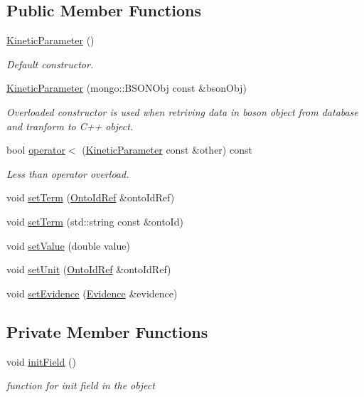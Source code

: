 \subsection*{Public Member Functions}
\begin{DoxyCompactItemize}
\item 
\hyperlink{classunisys_1_1KineticParameter_a107ffde8042bf3438e7f10fe5a4a7332}{Kinetic\-Parameter} ()
\begin{DoxyCompactList}\small\item\em Default constructor. \end{DoxyCompactList}\item 
\hyperlink{classunisys_1_1KineticParameter_a4642bb482bdcb05cdd80bfd70046b244}{Kinetic\-Parameter} (mongo\-::\-B\-S\-O\-N\-Obj const \&bson\-Obj)
\begin{DoxyCompactList}\small\item\em Overloaded constructor is used when retriving data in boson object from database and tranform to C++ object. \end{DoxyCompactList}\item 
bool \hyperlink{classunisys_1_1KineticParameter_a784e2bd0fe8f2e1d8b72f8f4c1af7add}{operator$<$} (\hyperlink{classunisys_1_1KineticParameter}{Kinetic\-Parameter} const \&other) const 
\begin{DoxyCompactList}\small\item\em Less than operator overload. \end{DoxyCompactList}\item 
void \hyperlink{classunisys_1_1KineticParameter_afa67168536156bf838bf8b31abb70966}{set\-Term} (\hyperlink{classunisys_1_1OntoIdRef}{Onto\-Id\-Ref} \&onto\-Id\-Ref)
\item 
void \hyperlink{classunisys_1_1KineticParameter_a7bd5c02a95e97b67b44ae069be83a80d}{set\-Term} (std\-::string const \&onto\-Id)
\item 
void \hyperlink{classunisys_1_1KineticParameter_a551e087e8aca7dd05edde40bcc50265f}{set\-Value} (double value)
\item 
void \hyperlink{classunisys_1_1KineticParameter_a3100673430d3174515d8a0e8864e60a3}{set\-Unit} (\hyperlink{classunisys_1_1OntoIdRef}{Onto\-Id\-Ref} \&onto\-Id\-Ref)
\item 
void \hyperlink{classunisys_1_1KineticParameter_addfc6fe1f5bec492188231525a69ffc6}{set\-Evidence} (\hyperlink{classunisys_1_1Evidence}{Evidence} \&evidence)
\end{DoxyCompactItemize}
\subsection*{Private Member Functions}
\begin{DoxyCompactItemize}
\item 
void \hyperlink{classunisys_1_1KineticParameter_a433dff8934423dc18efda6bb44b2f477}{init\-Field} ()
\begin{DoxyCompactList}\small\item\em function for init field in the object \end{DoxyCompactList}\end{DoxyCompactItemize}
